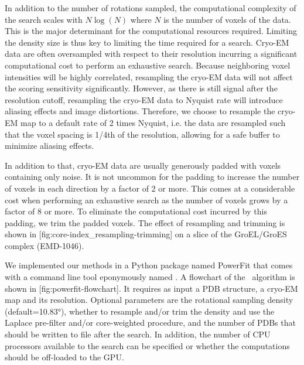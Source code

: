 In addition to the number of rotations sampled, the computational complexity of
the search scales with $N \log\left( N \right)$ where $N$ is the number of
voxels of the data. This is the major determinant for the computational
resources required. Limiting the density size is thus key to limiting the time
required for a search. Cryo-EM data are often oversampled with respect to their
resolution incurring a significant computational cost to perform an exhaustive
search.  Because neighboring voxel intensities will be highly correlated,
resampling the cryo-EM data will not affect the scoring sensitivity
significantly. However, as there is still signal after the resolution cutoff,
resampling the cryo-EM data to Nyquist rate will introduce aliasing effects and
image distortions.  Therefore, we choose to resample the cryo-EM map to a
default rate of 2 times Nyquist, i.e. the data are resampled such that the
voxel spacing is 1/4th of the resolution, allowing for a safe buffer to
minimize aliasing effects. 

In addition to that, cryo-EM data are usually generously padded with voxels
containing only noise. It is not uncommon for the padding to increase the
number of voxels in each direction by a factor of 2 or more. This comes at a
considerable cost when performing an exhaustive search as the number of voxels
grows by a factor of 8 or more. To eliminate the computational cost incurred by
this padding, we trim the padded voxels. The effect of resampling and trimming
is shown in [fig:core-index_resampling-trimming] on a slice of
the GroEL/GroES complex (EMD-1046). 


We implemented our methods in a Python package named PowerFit that comes with a
command line tool eponymously named \powerfit. A flowchart of the \powerfit\
algorithm is shown in [fig:powerfit-flowchart]. It requires as input
a PDB structure, a cryo-EM map and its resolution. Optional parameters are the
rotational sampling density (default=10.83°), whether to resample and/or trim
the density and use the Laplace pre-filter and/or core-weighted procedure, and
the number of PDBs that should be written to file after the search. In
addition, the number of CPU processors available to the search can be specified
or whether the computations should be off-loaded to the GPU. 

{}

